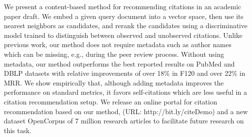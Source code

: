 We present a content-based method for recommending citations in an academic paper draft. We embed a given query document into a vector space, then use its nearest neighbors as candidates, and rerank the candidates using a discriminative model trained to distinguish between observed and unobserved citations. Unlike previous work, our method does not require metadata such as author names which can be missing, e.g., during the peer review process. Without using metadata, our method outperforms the best reported results on PubMed and DBLP datasets with relative improvements of over 18\% in F1\@20 and over 22\% in MRR. We show empirically that, although adding metadata improves the performance on standard metrics, it favors self-citations which are less useful in a citation recommendation setup. We release an online portal for citation recommendation based on our method, (URL: http://bit.ly/citeDemo) and a new dataset OpenCorpus of 7 million research articles to facilitate future research on this task.

